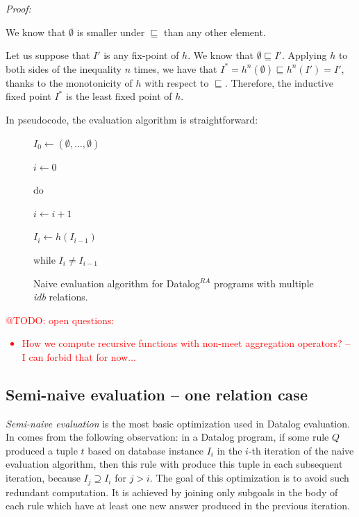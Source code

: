 \documentclass{pracamgr}
\makeatletter
\theoremstyle{plain}
\theoremstyle{definition}
\theoremstyle{remark}
\newcommand{\todo}[1]{\textcolor{red}{@TODO: #1}}
\newcommand{\datalogra}{Datalog$^{RA}$ }
\newcommand{\narrow}[1]{\begin{changemargin}{2cm}{2cm} #1 \end{changemargin}}
\makeatother
\begin{document}
\emph{Proof:} 

We know that $\emptyset$ is smaller under $\sqsubseteq$ than any other element.

Let us suppose that $I'$ is any fix-point of $h$.  We know that $\emptyset \sqsubseteq I'$. Applying $h$ to both sides of the inequality $n$ times, we have that $I^* = h^n(\emptyset) \sqsubseteq h^n(I') = I'$, thanks to the monotonicity of $h$ with respect to $\sqsubseteq$. Therefore, the inductive fixed point $I^*$ is the least fixed point of $h$.

In pseudocode, the evaluation algorithm is straightforward:

\begin{figure}[h!]
\narrow{
$I_0 \leftarrow (\emptyset, \dots, \emptyset)$

$i \leftarrow 0$

do

{\addtolength{\leftskip}{5mm}

$i \leftarrow i + 1$

$I_i \leftarrow h(I_{i-1})$

}

while $I_i \ne I_{i-1}$

\caption{Naive evaluation algorithm for \datalogra programs with multiple \textit{idb} relations.}
}
\end{figure}


\todo{open questions:
\begin{itemize}
\item How we compute recursive functions with non-meet aggregation operators? -- I can forbid that for now...
\end{itemize}
}


\subsection{Semi-naive evaluation -- one relation case}
\emph{Semi-naive evaluation} is the most basic optimization used in Datalog evaluation. In comes from the following observation: in a Datalog program, if some rule $Q$ produced a tuple $t$ based on database instance $I_i$ in the $i$-th iteration of the naive evaluation algorithm, then this rule with produce this tuple in each subsequent iteration, because $I_j \supseteq I_i$ for $j > i$. The goal of this optimization is to avoid such redundant computation. It is achieved by joining only subgoals in the body of each rule which have at least one new answer produced in the previous iteration.
\end{document}
